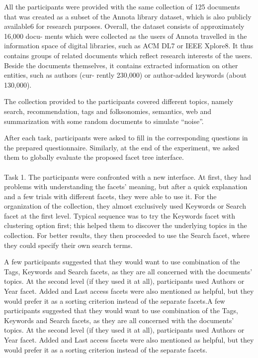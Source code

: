 \documentclass{llncs}
\begin{document}
All the participants were provided with the same collection of 125 documents that was created as a subset of the Annota library dataset, which is also publicly available6 for research purposes. Overall, the dataset consists of approximately 16,000 docu- ments which were collected as the users of Annota travelled in the information space of digital libraries, such as ACM DL7 or IEEE Xplore8. It thus contains groups of related documents which reflect research interests of the users. Beside the documents themselves, it contains extracted information on other entities, such as authors (cur- rently 230,000) or author-added keywords (about 130,000).

The collection provided to the participants covered different topics, namely search, recommendation, tags and folksonomies, semantics, web and summarization with some random documents to simulate “noise”.

After each task, participants were asked to fill in the corresponding questions in the prepared questionnaire. Similarly, at the end of the experiment, we asked them to globally evaluate the proposed facet tree interface. \\ \\
Task 1. The participants were confronted with a new interface. At first, they had problems with understanding the facets’ meaning, but after a quick explanation and a few trials with different facets, they were able to use it. For the organization of the collection, they almost exclusively used Keywords or Search facet at the first level. Typical sequence was to try the Keywords facet with clustering option first; this helped them to discover the underlying topics in the collection. For better results, they then proceeded to use the Search facet, where they could specify their own search terms.

A few participants suggested that they would want to use combination of the Tags, Keywords and Search facets, as they are all concerned with the documents’ topics. At the second level (if they used it at all), participants used Authors or Year facet. Added and Last access facets were also mentioned as helpful, but they would prefer it as a sorting criterion instead of the separate facets.A few participants suggested that they would want to use combination of the Tags, Keywords and Search facets, as they are all concerned with the documents’ topics. At the second level (if they used it at all), participants used Authors or Year facet. Added and Last access facets were also mentioned as helpful, but they would prefer it as a sorting criterion instead of the separate facets.
\end{document}
